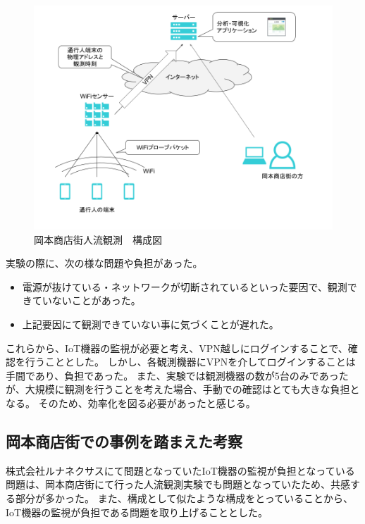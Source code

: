 \begin{figure}[htb]
\includegraphics[width=16cm]{images/okamoto_diag1.png}
\caption{岡本商店街人流観測　構成図}
\label{fig:okamoto_diag1}
\end{figure}

実験の際に、次の様な問題や負担があった。
\begin{itemize}
\item 電源が抜けている・ネットワークが切断されているといった要因で、観測できていないことがあった。
\item 上記要因にて観測できていない事に気づくことが遅れた。
\end{itemize}
これらから、IoT機器の監視が必要と考え、VPN越しにログインすることで、確認を行うこととした。
しかし、各観測機器にVPNを介してログインすることは手間であり、負担であった。
また、実験では観測機器の数が5台のみであったが、大規模に観測を行うことを考えた場合、手動での確認はとても大きな負担となる。
そのため、効率化を図る必要があったと感じる。

\subsection{岡本商店街での事例を踏まえた考察}
株式会社ルナネクサスにて問題となっていたIoT機器の監視が負担となっている問題は、岡本商店街にて行った人流観測実験でも問題となっていたため、共感する部分が多かった。
また、構成として似たような構成をとっていることから、IoT機器の監視が負担である問題を取り上げることとした。






